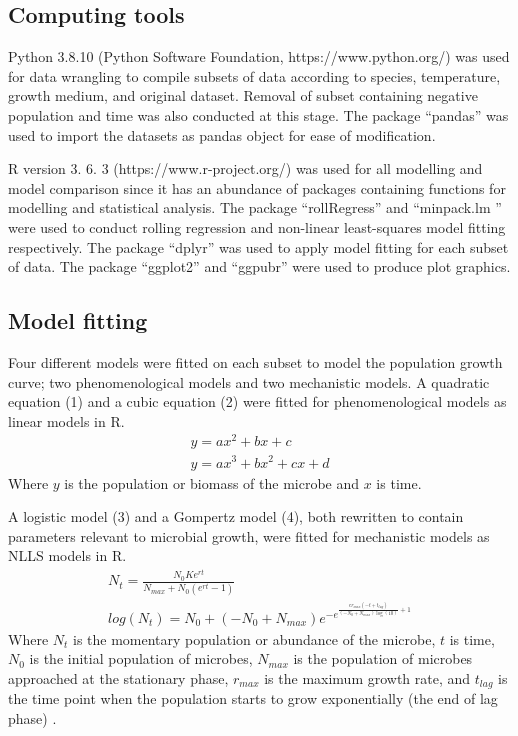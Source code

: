 \documentclass[11pt, a4paper]{article}
\begin{document}
\subsection{Computing tools}
Python 3.8.10 (Python Software Foundation, https://www.python.org/) was used for data wrangling to compile subsets of data according to species, temperature, growth medium, and original dataset. Removal of subset containing negative population and time was also conducted at this stage. The package “pandas” was used to import the datasets as pandas object for ease of modification. \par

R version 3. 6. 3 (https://www.r-project.org/) was used for all modelling and model comparison since it has an abundance of packages containing functions for modelling and statistical analysis. The package “rollRegress” and “minpack.lm ” were used to conduct rolling regression and non-linear least-squares model fitting respectively.  The package “dplyr” was used to apply model fitting for each subset of data. The package “ggplot2” and “ggpubr” were used to produce plot graphics. 


\subsection{Model fitting}
Four different models were fitted on each subset to model the population growth curve; two phenomenological models and two mechanistic models. A quadratic equation (1) and a cubic equation (2) were fitted for phenomenological models as linear models in R.
\begin{align}
y = ax^2 + bx + c \\
y = ax^3 + bx^2 + cx + d
\end{align}
Where $y$ is the population or biomass of the microbe and $x$ is time. \par

A logistic model (3) and a Gompertz model (4), both rewritten to contain parameters relevant to microbial growth, were fitted for mechanistic models as NLLS models in R. 
\begin{align}
N_t= \frac{N_0 Ke^{rt}}{N_{max} + N_0 \left(e^{rt} - 1\right)} \\
log(N_t) = N_{0} + \left(- N_{0} + N_{max}\right) e^{- e^{\frac{e r_{max} \left(- t + t_{lag}\right)}{\left(- N_{0} + N_{max}\right) \log{\left(10 \right)}} + 1}}
\end{align}
Where $N_t$ is the momentary population or abundance of the microbe, $t$ is time, $N_0$ is the initial population of microbes, $N_{max}$ is the population of microbes approached at the stationary phase, $r_{max}$ is the maximum growth rate, and $t_{lag}$ is the time point when the population starts to grow exponentially (the end of lag phase) \cite{Zwietering1990}. \par
\end{document}
